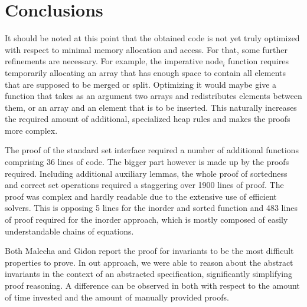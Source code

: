 

\chapter{Conclusions}\label{chapter:conclusion}


It should be noted at this point that the obtained code is not yet
truly optimized with respect to minimal memory allocation and access.
For that, some further refinements are necessary.
For example, the imperative \textsf{node$_i$} function
requires temporarily allocating
an array that has enough space to contain
all elements that are supposed to be merged or split.
Optimizing it would maybe give a function that takes
as an argument two arrays and redistributes elements between them,
or an array and an element that is to be inserted.
This naturally increases the required amount of additional,
specialized heap rules and makes the proofs more complex.

The proof of the standard set interface required a number of additional functions
comprising 36 lines of code.
The bigger part however is made up by the proofs required.
Including additional auxiliary lemmas, the whole proof of sortedness
and correct set operations required a staggering over 1900 lines of proof.
The proof was complex and hardly readable due to the 
extensive use of efficient solvers.
This is opposing 5 lines for the inorder and sorted function and
483 lines of proof required for the inorder approach,
which is mostly composed of easily understandable chains of equations.

Both Malecha and Gidon report the proof for invariants
to be the most difficult properties to prove.
In out approach, we were able to reason about the abstract invariants
in the context of an abstracted specification,
significantly simplifying proof reasoning.
A difference can be observed in \label{fig:proof-comparison}
both with respect to the amount of 
time invested and the amount of manually provided proofs.

